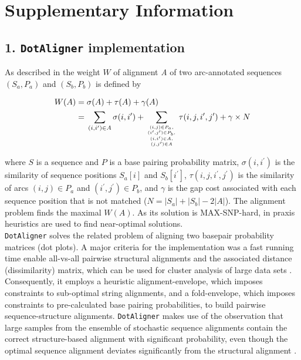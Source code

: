 \documentclass[a4paper,11pt]{article}
\newcommand\dotaligner{\texttt{DotAligner}}
\begin{document}
 


\newpage 
\section*{ Supplementary Information }

\subsection*{ 1. \dotaligner{} implementation }
\noindent As described in \cite{Palu2010} the weight $W$ of alignment \emph{A}
of two arc-annotated sequences $(S_a,P_a)$ and $(S_b,P_b)$ is defined by

\begin{equation}\label{eq1}
\begin{aligned}
	W(A) ={} & \sigma(A) + \tau(A) + \gamma(A) \\
	     ={} & \sum_{(i,i^\prime) \in A} \sigma(i,i^\prime) + \sum_{(i,j) \in
	P_a,\atop {(i^\prime,j^\prime) \in P_b,\atop {(i,i^\prime) \in
	A,\atop (j,j^\prime) \in A}}} \tau(i,j,i^\prime,j^\prime) + \gamma
	\times N
\end{aligned}
\end{equation}

\noindent where $S$ is a sequence and $P$ is a base pairing probability matrix,
$\sigma(i,i^\prime)$ is the similarity of sequence positions $S_a[i]$ and
$S_b[i^\prime]$, $\tau(i,j,i^\prime,j^\prime)$ is the similarity of arcs $(i,j)
\in P_a$ and $(i^\prime,j^\prime) \in P_b$,
and $\gamma$ is the gap cost associated with each sequence position that is not
matched ($N = |S_a|+|S_b|-2|A|$). The alignment problem finds the maximal
$W(A)$. As its solution is MAX-SNP-hard, in praxis heuristics are used to find
near-optimal solutions.\\

\dotaligner{} solves the related problem of aligning two basepair
probability matrices (dot plots). A major criteria for the implementation was a fast
running time enable all-vs-all pairwise structural alignments and the 
associated distance (dissimilarity) matrix, which can be used for 
cluster analysis of large data sets \cite{Will17432929}. Consequently, 
it employs a heuristic alignment-envelope, 
which imposes constraints to sub-optimal string alignments, 
and a fold-envelope, which imposes constraints to pre-calculated base pairing probabilities, 
to build pairwise sequence-structure alignments. 
\dotaligner{} makes use of the observation that large samples from the ensemble 
of stochastic sequence alignments contain the correct structure-based alignment
with significant probability,  even though the optimal
sequence alignment deviates significantly from the structural alignment
\cite{muckstein2002stochastic}. \\
\end{document}
